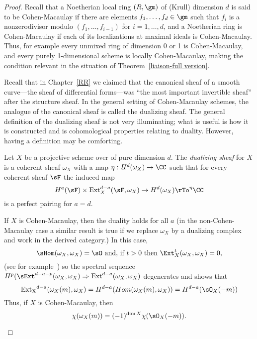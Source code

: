 \begin{proof}
Recall that a Noetherian local ring $(R,\gm)$ of (Krull) dimension $d$ is said to be Cohen-Macaulay if there are elements $f_1,\dots,f_d\in \gm$ such that
$f_i$ is a nonzerodivisor modulo $(f_1,\dots,f_{i-1})$ for $i =1,\dots,d$, and a Noetherian ring is Cohen-Macaulay if each of its localizations at maximal ideals
is Cohen-Macaulay. Thus, for example every unmixed ring of dimension 0 or 1 is Cohen-Macaulay, and every purely 1-dimensional scheme is locally Cohen-Macaulay,
making the condition relevant in the situation of Theorem~\ref{liaison-full version}. 

Recall that in Chapter~\ref{RR} we claimed that the canonical sheaf of a smooth curve---the sheaf of differential forms---was ``the most important invertible sheaf'' after the structure sheaf. In the general setting of Cohen-Macaulay schemes, the analogue of the canonical sheaf is called the dualizing sheaf.
The general definition of the dualizing sheaf is not very illuminating; what is useful is how it is constructed and is cohomological properties relating to duality.
However, having a definition may be comforting. 

\begin{definition}
Let $X$ be a projective scheme over of pure dimension $d$. The \emph{dualizing sheaf} for $X$ is a coherent sheaf $\omega_X$ 
with a map $\eta: H^d(\omega_X) \to \CC$ such that for every coherent sheaf  $\sF$ the induced map
$$
H^a(\sF) \times { \rm Ext}_X^{d-a}(\sF, \omega_X) \to H^d(\omega_X) \rTo^\eta \CC
$$
is a perfect pairing for $a=d$. 
\end{definition}


\begin{fact}
If $X$ is Cohen-Macaulay, then the duality holds for all $a$ (in the non-Cohen-Macaulay case a similar result is true if we replace $\omega_X$ by a dualizing complex
and work in the derived category.) In this case, 
$$
\sHom(\omega_X, \omega_X) = \sO \hbox{ and, if $t>0$ then } \Ext_X^{t}(\omega_X, \omega_X) = 0,
$$
(see for example~\cite[Theorem[Theorems 3.3.4 and 3.3.10d]{BrunsHerzog}) so the spectral sequence $H^p(\sExt^{d-a-p}(\omega_X, \omega_X) \Rightarrow {\rm Ext}^{d-a}(\omega_X, \omega_X)$ degenerates and shows that 
$$
{\rm Ext_X}^{d-a}(\omega_X(m), \omega_X) = H^{d-a}(Hom(\omega_X(m), \omega_X)) = H^{d-a}(\sO_X(-m))
$$
Thus, if $X$ is Cohen-Macaulay, then 
$$
\chi(\omega_X(m)) =(-1)^{\dim X}\chi(\sO_X(-m)).
$$


\end{fact}
\end{proof}
